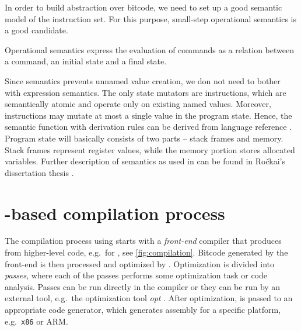 In order to build abstraction over \LLVM bitcode, we need to set up a good
semantic model of the instruction set. For this purpose, small-step operational
semantics \cite{Plotkin04} is a good candidate.

\begin{definition}
Operational semantics express the evaluation of commands as a relation between
a command, an initial state and a final state.
\end{definition}

\noindent
Since \LLVMIR semantics prevents unnamed value creation, we don not need to
bother with expression semantics. The only state mutators are instructions, which are
semantically atomic and operate only on existing named values. Moreover,
instructions may mutate at most a single value in the program state. Hence, the
semantic function with derivation rules can be derived from \LLVM
language reference \cite{LLVM:langref}. Program state will basically
consists of two parts -- stack frames and memory. Stack frames represent
register values, while the memory portion stores allocated variables.
Further description of \LLVM semantics as used in \DIVINE can be found in Ročkai's
dissertation thesis \cite{Rockai15}.

\section{\LLVM-based compilation process} \label{sec:compilation}

The compilation process using \LLVM starts with a \emph{front-end} compiler that produces
\LLVMIR from higher-level code, e.g.~\clang for \Cpp{}, see \autoref{fig:compilation}.
Bitcode generated by the front-end is then processed and optimized by \LLVM.
Optimization is divided into \LLVM \emph{passes}, where each of the passes
performs some optimization task or code analysis. Passes can be run directly
in the compiler or they can be run by an external tool, e.g.~the \LLVM
optimization tool \emph{opt} \cite{LLVM:opt}. After optimization, \LLVMIR is passed to
an appropriate code generator, which generates assembly for a specific
platform, e.g.~\texttt{x86} or ARM.

